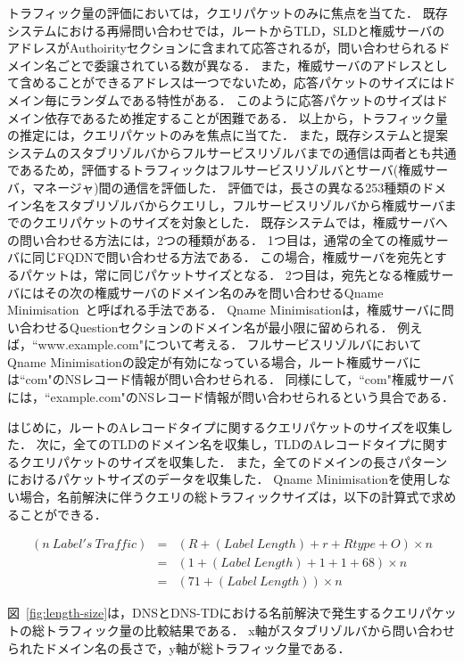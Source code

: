 トラフィック量の評価においては，クエリパケットのみに焦点を当てた．
既存システムにおける再帰問い合わせでは，ルートからTLD，SLDと権威サーバのアドレスがAuthoirityセクションに含まれて応答されるが，問い合わせられるドメイン名ごとで委譲されている数が異なる．
また，権威サーバのアドレスとして含めることができるアドレスは一つでないため，応答パケットのサイズにはドメイン毎にランダムである特性がある．
このように応答パケットのサイズはドメイン依存であるため推定することが困難である．
以上から，トラフィック量の推定には，クエリパケットのみを焦点に当てた．
また，既存システムと提案システムのスタブリゾルバからフルサービスリゾルバまでの通信は両者とも共通であるため，評価するトラフィックはフルサービスリゾルバとサーバ(権威サーバ，マネージャ)間の通信を評価した．
評価では，長さの異なる253種類のドメイン名をスタブリゾルバからクエリし，フルサービスリゾルバから権威サーバまでのクエリパケットのサイズを対象とした．
既存システムでは，権威サーバへの問い合わせる方法には，2つの種類がある．
1つ目は，通常の全ての権威サーバに同じFQDNで問い合わせる方法である．
この場合，権威サーバを宛先とするパケットは，常に同じパケットサイズとなる．
2つ目は，宛先となる権威サーバにはその次の権威サーバのドメイン名のみを問い合わせるQname Minimisation~\cite{rfc7816}と呼ばれる手法である．
Qname Minimisationは，権威サーバに問い合わせるQuestionセクションのドメイン名が最小限に留められる．
例えば，``www.example.com"について考える．
フルサービスリゾルバにおいてQname Minimisationの設定が有効になっている場合，ルート権威サーバには``com"のNSレコード情報が問い合わせられる．
同様にして，``com"権威サーバには，``example.com"のNSレコード情報が問い合わせられるという具合である．

はじめに，ルートのAレコードタイプに関するクエリパケットのサイズを収集した．
次に，全てのTLDのドメイン名を収集し，TLDのAレコードタイプに関するクエリパケットのサイズを収集した．
また，全てのドメインの長さパターンにおけるパケットサイズのデータを収集した．
Qname Minimisationを使用しない場合，名前解決に伴うクエリの総トラフィックサイズは，以下の計算式で求めることができる．

\begin{eqnarray}
 (n\ Label's\ Traffic) &=& (R + (Label\ Length) + r + Rtype + O) \times n\\
 &=& (1 + (Label\ Length) + 1 + 1 + 68) \times n\\
 &=& (71 + (Label\ Length)) \times n
\end{eqnarray}

図~\ref{fig:length-size}は，DNSとDNS-TDにおける名前解決で発生するクエリパケットの総トラフィック量の比較結果である．
x軸がスタブリゾルバから問い合わせられたドメイン名の長さで，y軸が総トラフィック量である．

